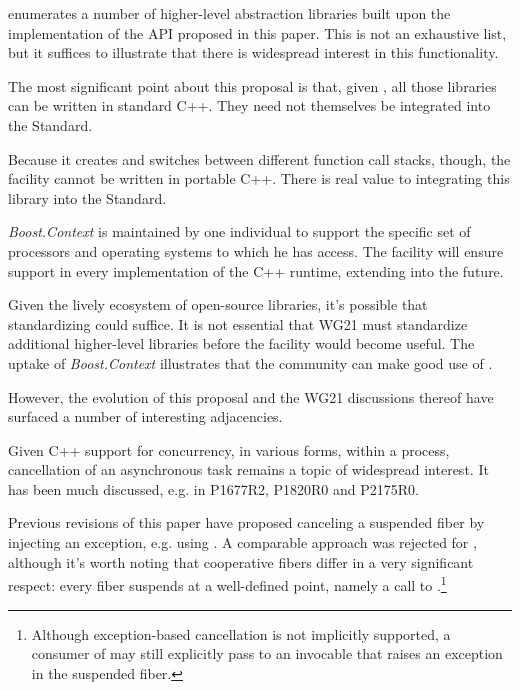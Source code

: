 

 enumerates a number of higher-level abstraction libraries
built upon the \bcontext\xspace implementation of the API proposed in this paper.
This is not an exhaustive list, but it suffices to illustrate that there is
widespread interest in this functionality.

The most significant point about this proposal is that, given \fiber, all
those libraries can be written in standard C++. They need not themselves be
integrated into the Standard.

Because it creates and switches between different function call stacks,
though, the \fiber facility cannot be written in portable C++. There is real
value to integrating this library into the Standard.

\emph{Boost.Context} is maintained by one individual to support the specific
set of processors and operating systems to which he has access. The \fiber
facility will ensure support in every implementation of the C++ runtime,
extending into the future.

Given the lively ecosystem of open-source libraries, it's possible that
standardizing  could suffice. It is not essential that
WG21 must standardize additional higher-level libraries before the facility
would become useful. The uptake of \emph{Boost.Context} illustrates that the
community can make good use of .

However, the evolution of this proposal and the WG21 discussions thereof have
surfaced a number of interesting adjacencies.


Given C++ support for concurrency, in various forms, within a process,
cancellation of an asynchronous task remains a topic of widespread interest.
It has been much discussed, e.g. in P1677R2\cite{P1677R2},
P1820R0\cite{P1820R0} and P2175R0\cite{P2175R0}.

Previous revisions of this paper have proposed canceling a suspended fiber by
injecting an exception, e.g. using \fiber\cpp{::}\resumewith. A comparable
approach was rejected for , although it's worth noting that
cooperative fibers differ in a very significant respect: every fiber suspends
at a well-defined point, namely a call to \resumewith.\footnote{Although
exception-based cancellation is not implicitly supported, a consumer of \fiber
may still explicitly pass to \resumewith an invocable that raises an exception
in the suspended fiber.}

